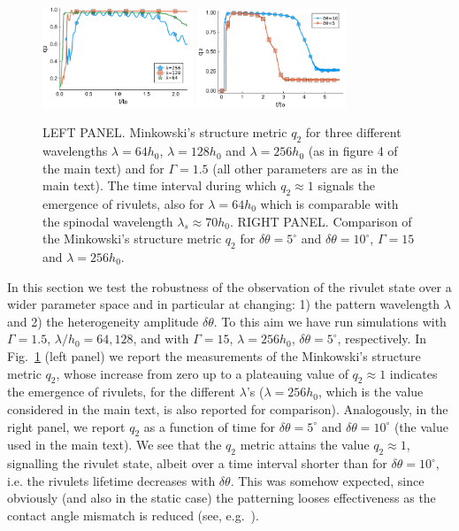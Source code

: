 \documentclass[amsmath,amssymb,showpacs,prl,superscriptaddress,notitlepage]{revtex4-1}
\begin{document}
\begin{figure}
    \centering
    \includegraphics[width=0.4\textwidth]{SupMatFig_1.pdf}
    \includegraphics[width=0.4\textwidth]{SupMatFig_2.pdf}
    \caption{LEFT PANEL. Minkowski's structure metric $q_2$ for three different wavelengths $\lambda=64 h_0$, $\lambda=128 h_0$ and 
    $\lambda=256 h_0$ (as in figure 4 of the main text) and for $\Gamma=1.5$ (all other parameters are as in the main text). 
    The time interval during which $q_2 \approx 1$ signals the emergence of rivulets, also for $\lambda = 64 h_0$ which is comparable with the spinodal wavelength $\lambda_s \approx 70 h_0$. RIGHT PANEL. Comparison of the Minkowski's structure metric $q_2$ for $\delta\theta=5^{\circ}$ and $\delta\theta=10^{\circ}$, 
    $\Gamma = 15$ and $\lambda = 256 h_0$.}
    \label{fig:q2_difflambda}
\end{figure}
\noindent In this section we test the robustness of the observation of the rivulet 
state over a wider parameter space and in particular at changing: 1) the 
pattern wavelength $\lambda$ and 2) the heterogeneity amplitude $\delta \theta$.
To this aim we have run simulations with $\Gamma=1.5$, $\lambda/h_0 = 64, 128$, and with $\Gamma = 15$, $\lambda = 256 h_0$, $\delta \theta = 5^{\circ}$, respectively.
In Fig.~\ref{fig:q2_difflambda} (left panel) we report the measurements of the Minkowski's structure metric $q_2$, whose 
increase from zero up to a plateauing value of $q_2 \approx 1$ indicates the emergence of rivulets, for 
the different $\lambda$'s ($\lambda=256 h_0$, which is the value considered in the main text, is also reported 
for comparison).
Analogously, in the right panel, we report $q_2$ as a function of time for  
$\delta \theta = 5^{\circ}$  and $\delta \theta = 10^{\circ}$ (the value used in the main text). 
We see that the $q_2$ metric attains the value $q_2 \approx 1$, signalling the rivulet state, albeit over 
a time interval shorter than for $\delta \theta = 10^{\circ}$, i.e. the rivulets lifetime decreases with 
$\delta \theta$. This was somehow expected, since obviously (and also in the static case) 
the patterning looses effectiveness as the contact angle mismatch is reduced (see, e.g.~\cite{KonnurPRL2000}).
\end{document}
